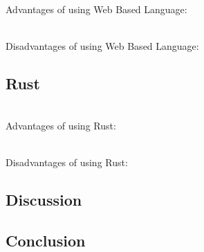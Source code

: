 \documentclass[onecolumn, draftclsnofoot,10pt, compsoc]{IEEEtran}
\begin{document}
			\noindent \\Advantages of using Web Based Language:

			\noindent \\Disadvantages of using Web Based Language:


			\subsection{Rust}

			\noindent \\Advantages of using Rust:

			\noindent \\Disadvantages of using Rust:


			\subsection{Discussion}

			\subsection{Conclusion}


		
		
\end{document}

